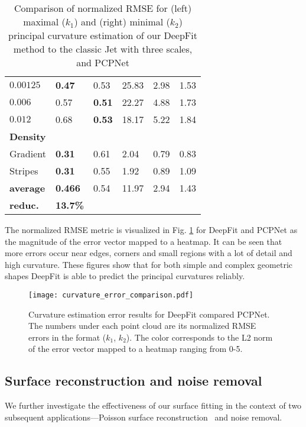 \begin{table}
{\begin{tabular}{| M{0.1\textwidth} | M{0.08\textwidth}| M{0.08\textwidth} | M{0.06\textwidth}|
		M{0.06\textwidth}|	M{0.06\textwidth}|}
            $0.00125$  & \textbf{0.47} & 0.53 & 25.83 & 2.98 & 1.53  \\
            $0.006$    & 0.57 & \textbf{0.51} & 22.27 & 4.88 & 1.73  \\
            $0.012$    & 0.68 & \textbf{ 0.53} & 18.17 & 5.22 & 1.84 \\
            \textbf{Density}    & & & & & \\
            Gradient            & \textbf{0.31} & 0.61 &  2.04 & 0.79 & 0.83 \\
            Stripes             & \textbf{0.31 }& 0.55 &  1.92 & 0.89 & 1.09 \\
            \hline
		    \textbf{average}    & \textbf{0.466} & 0.54 & 11.97 & 2.94 & 1.43\\
		    \textbf{reduc.}    & \textbf{13.7\%} & &  &  & \\
		    \hline
		\end{tabular}
}
	\caption{Comparison of normalized RMSE for (left) maximal ($k_1$)  and (right) minimal ($k_2$) principal curvature  estimation of our DeepFit method to the classic Jet \cite{cazals2005estimating} with three scales, and PCPNet \cite{guerrero2018pcpnet}}
	\label{table:results:curvature_baselines}
\end{table}
 
The normalized RMSE metric is visualized in Fig. \ref{fig:results_curvature_error_comparison} for DeepFit and PCPNet as the magnitude of the error vector mapped to a heatmap.  It can be seen that more errors occur near edges, corners and small regions with a lot of detail and high curvature.
These figures show that for both simple and complex geometric shapes DeepFit is able to predict the principal curvatures reliably. 

\begin{figure}
\centering
	\texttt{[image: curvature\_error\_comparison.pdf]}
	\caption{Curvature estimation error results for DeepFit compared PCPNet. The numbers under each point cloud are its normalized RMSE errors in the format ($k_1$, $k_2$). The color corresponds to the L2 norm of the error vector mapped to a heatmap ranging from 0-5.}
	\label{fig:results_curvature_error_comparison} 
\end{figure}

\subsection{Surface reconstruction and noise removal}
We further investigate the effectiveness of our surface fitting in the context of two subsequent applications---Poisson surface reconstruction~\cite{kazhdan2006poisson} and noise removal.

